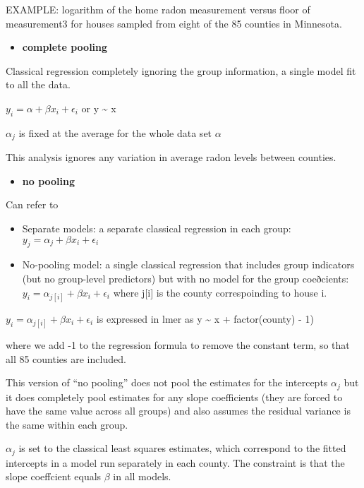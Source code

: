 \documentclass[
]{article}
\providecommand{\tightlist}{%
  \setlength{\itemsep}{0pt}\setlength{\parskip}{0pt}}
\begin{document}
EXAMPLE: logarithm of the home radon measurement versus floor of
measurement3 for houses sampled from eight of the 85 counties in
Minnesota.

\begin{itemize}
\tightlist
\item
  \textbf{complete pooling}
\end{itemize}

Classical regression completely ignoring the group information, a single
model fit to all the data.

\(y_i= \alpha +\beta x_i + \epsilon_i\) or y \textasciitilde{} x

\(\alpha_{j}\) is fixed at the average for the whole data set \(\alpha\)

This analysis ignores any variation in average radon levels between
counties.

\begin{itemize}
\tightlist
\item
  \textbf{no pooling}
\end{itemize}

Can refer to

\begin{itemize}
\item
  Separate models: a separate classical regression in each group:
  \(y_j= \alpha_{j} +\beta x_i + \epsilon_i\)
\item
  No-pooling model: a single classical regression that includes group
  indicators (but no group-level predictors) but with no model for the
  group coeðcients: \(y_i= \alpha_{j[i]} +\beta x_i + \epsilon_i\) where
  j{[}i{]} is the county correspoinding to house i.
\end{itemize}

\(y_i= \alpha_{j[i]} +\beta x_i + \epsilon_i\) is expressed in lmer as y
\textasciitilde{} x + factor(county) - 1)

where we add -1 to the regression formula to remove the constant term,
so that all 85 counties are included.

This version of ``no pooling'' does not pool the estimates for the
intercepts \(\alpha_{j}\) but it does completely pool estimates for any
slope coefficients (they are forced to have the same value across all
groups) and also assumes the residual variance is the same within each
group.

\(\alpha_{j}\) is set to the classical least squares estimates, which
correspond to the fitted intercepts in a model run separately in each
county. The constraint is that the slope coeffcient equals \(\beta\) in
all models.
\end{document}

